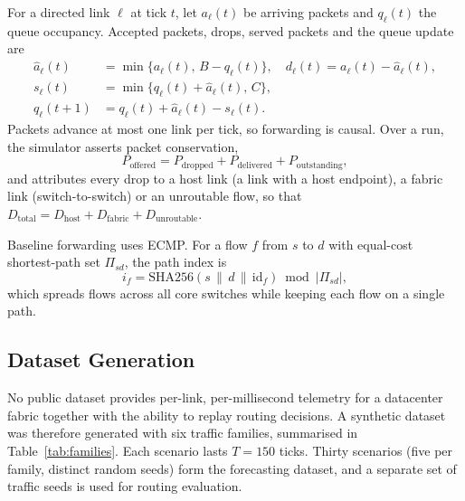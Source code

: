 \documentclass[conference]{IEEEtran}
\begin{document}
For a directed link $\ell$ at tick $t$, let $a_\ell(t)$ be arriving packets and $q_\ell(t)$ the queue occupancy. Accepted packets, drops, served packets and the queue update are
\begin{align}
\hat{a}_\ell(t) &= \min\{a_\ell(t),\, B - q_\ell(t)\}, \quad d_\ell(t)=a_\ell(t)-\hat{a}_\ell(t), \label{eq:accept}\\
s_\ell(t) &= \min\{q_\ell(t)+\hat{a}_\ell(t),\, C\}, \label{eq:serve}\\
q_\ell(t+1) &= q_\ell(t)+\hat{a}_\ell(t)-s_\ell(t). \label{eq:queue}
\end{align}
Packets advance at most one link per tick, so forwarding is causal. Over a run, the simulator asserts packet conservation,
\begin{equation}
P_{\text{offered}} = P_{\text{dropped}} + P_{\text{delivered}} + P_{\text{outstanding}},
\label{eq:conservation}
\end{equation}
and attributes every drop to a host link (a link with a host endpoint), a fabric link (switch-to-switch) or an unroutable flow, so that $D_{\text{total}}=D_{\text{host}}+D_{\text{fabric}}+D_{\text{unroutable}}$.

Baseline forwarding uses ECMP. For a flow $f$ from $s$ to $d$ with equal-cost shortest-path set $\Pi_{sd}$, the path index is
\begin{equation}
i_f = \mathrm{SHA256}(s \,\|\, d \,\|\, \mathrm{id}_f) \bmod |\Pi_{sd}|,
\label{eq:ecmp}
\end{equation}
which spreads flows across all core switches while keeping each flow on a single path.

\subsection{Dataset Generation}
No public dataset provides per-link, per-millisecond telemetry for a datacenter fabric together with the ability to replay routing decisions. A synthetic dataset was therefore generated with six traffic families, summarised in Table~\ref{tab:families}. Each scenario lasts $T=150$ ticks. Thirty scenarios (five per family, distinct random seeds) form the forecasting dataset, and a separate set of traffic seeds is used for routing evaluation.
\end{document}
